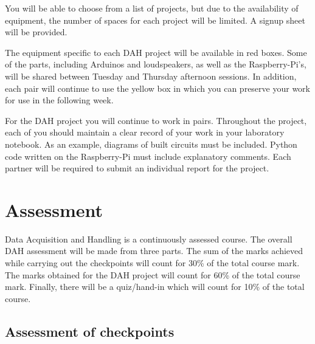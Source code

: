 You will be able to choose from a list of projects, but due to the availability of equipment, the number of spaces for each project will be limited. 
A signup sheet will be provided.

The equipment specific to each DAH project will be available in red boxes. Some of the parts, including Arduinos and loudspeakers, as well as the Raspberry-Pi's, will be shared between Tuesday and Thursday afternoon sessions. In addition, each pair will continue to use the yellow box in which you can preserve your work for use in the following week. 

For the DAH project you will continue to work in pairs. Throughout the project, each of you should maintain a clear record of your work in your laboratory notebook. As an example, diagrams of built circuits must be included. Python code written on the Raspberry-Pi must include explanatory comments.  Each partner will be required to submit an individual report for the project. 
\vfill
\newpage

\section{Assessment} 

Data Acquisition and Handling is a continuously assessed course. The overall DAH  assessment will be made from three parts. The sum of the marks achieved while carrying out the checkpoints will count for 30\% of the total course mark.  The marks obtained for the DAH project will count for 60\% of the total course mark. Finally, there will be a quiz/hand-in which will count for 10\% of the total course.

\subsection{Assessment of checkpoints}

